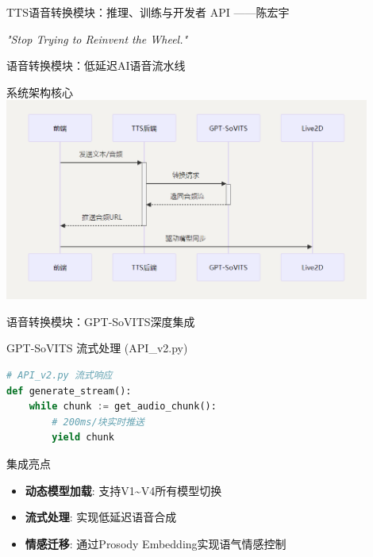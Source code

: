 \documentclass{beamer}
\begin{document}
\begin {frame}{TTS语音转换模块：推理、训练与开发者 API
    \hfill ——陈宏宇}

\centering
\textit{"Stop Trying to Reinvent the Wheel."} \\
\vspace {1em}
\end{frame}

\begin{frame}{语音转换模块：低延迟AI语音流水线}
    \begin{block}{系统架构核心}
        \centering
        \includegraphics[width=0.9\textwidth]{pic/voice_seq.png}
    \end{block}

\end{frame}
\begin{frame}[fragile]{语音转换模块：GPT-SoVITS深度集成}
    \begin{block}{GPT-SoVITS 流式处理 (API\_v2.py)}
        \begin{lstlisting}[language=Python]
# API_v2.py 流式响应
def generate_stream():
    while chunk := get_audio_chunk():
        # 200ms/块实时推送
        yield chunk  
\end{lstlisting}
    \end{block}
    \begin{exampleblock}{集成亮点}
        \begin{itemize}
            \item \textbf{动态模型加载}: 支持V1\textasciitilde V4所有模型切换
            \item \textbf{流式处理}: 实现低延迟语音合成
            \item \textbf{情感迁移}: 通过Prosody Embedding实现语气情感控制
        \end{itemize}
    \end{exampleblock}
\end{frame}
\end{document}
